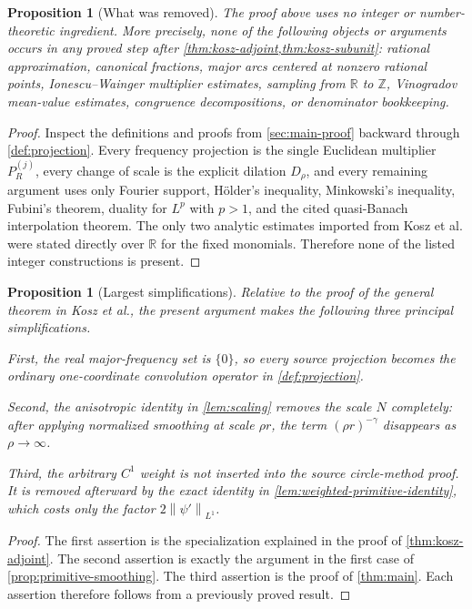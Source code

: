\documentclass[11pt]{article}
\newtheorem{proposition}[theorem]{Proposition}
\newcommand{\R}{\mathbb{R}}
\newcommand{\norm}[2]{\left\lVert #1\right\rVert_{#2}}
\begin{document}
\begin{proposition}[What was removed]\label{prop:removed-material}
The proof above uses no integer or number-theoretic ingredient.  More precisely, none of the following objects or arguments occurs in any proved step after \cref{thm:kosz-adjoint,thm:kosz-subunit}: rational approximation, canonical fractions, major arcs centered at nonzero rational points, Ionescu--Wainger multiplier estimates, sampling from \(\R\) to \(\mathbb Z\), Vinogradov mean-value estimates, congruence decompositions, or denominator bookkeeping.
\end{proposition}

\begin{proof}
Inspect the definitions and proofs from \cref{sec:main-proof} backward through \cref{def:projection}.  Every frequency projection is the single Euclidean multiplier \(P_R^{(j)}\), every change of scale is the explicit dilation \(D_\rho\), and every remaining argument uses only Fourier support, H\"older's inequality, Minkowski's inequality, Fubini's theorem, duality for \(L^p\) with \(p>1\), and the cited quasi-Banach interpolation theorem.  The only two analytic estimates imported from Kosz et al. were stated directly over \(\R\) for the fixed monomials.  Therefore none of the listed integer constructions is present.
\end{proof}

\begin{proposition}[Largest simplifications]\label{prop:simplifications}
Relative to the proof of the general theorem in Kosz et al., the present argument makes the following three principal simplifications.

First, the real major-frequency set is \(\{0\}\), so every source projection becomes the ordinary one-coordinate convolution operator in \cref{def:projection}.

Second, the anisotropic identity in \cref{lem:scaling} removes the scale \(N\) completely: after applying normalized smoothing at scale \(\rho r\), the term \((\rho r)^{-\gamma}\) disappears as \(\rho\to\infty\).

Third, the arbitrary \(C^1\) weight is not inserted into the source circle-method proof.  It is removed afterward by the exact identity in \cref{lem:weighted-primitive-identity}, which costs only the factor \(2\norm{\psi'}{L^1}\).
\end{proposition}

\begin{proof}
The first assertion is the specialization explained in the proof of \cref{thm:kosz-adjoint}.  The second assertion is exactly the argument in the first case of \cref{prop:primitive-smoothing}.  The third assertion is the proof of \cref{thm:main}.  Each assertion therefore follows from a previously proved result.
\end{proof}
\end{document}
